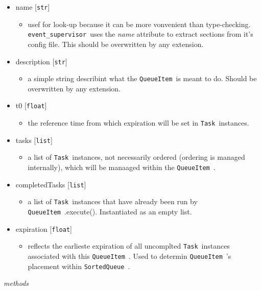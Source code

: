 \documentclass{article}
\newcommand{\SortedQueue}{\texttt{SortedQueue}~}
\newcommand{\QueueItem}{\texttt{QueueItem}~}
\newcommand{\Task}{\texttt{Task}~}
\newcommand{\eventSupervisor}{\texttt{event\_supervisor}~}
\begin{document}
\begin{itemize}
    \item{name [\texttt{str}]
        \begin{itemize}
            \item{usef for look-up because it can be more vonvenient than type-checking. \eventSupervisor uses the \textit{name} attribute to extract sections from it's config file. This should be overwritten by any extension.}
        \end{itemize}
         }
    \item{description [\texttt{str}]
        \begin{itemize}
            \item{a simple string describint what the \QueueItem is meant to do. Should be overwritten by any extension.}
        \end{itemize}
         }
    \item{t0 [\texttt{float}]
        \begin{itemize}
            \item{the reference time from which expiration will be set in \Task instances.}
        \end{itemize}
         }
    \item{tasks [\texttt{list}]
        \begin{itemize}
            \item{a list of \Task instances, not necessarily ordered (ordering is managed internally), which will be manaaged within the \QueueItem.}
        \end{itemize}
         }
    \item{completedTasks [\texttt{list}]
        \begin{itemize}
            \item{a list of \Task instances that have already been run by \QueueItem.execute(). Instantiated as an empty list.}
        \end{itemize}
         }
    \item{expiration [\texttt{float}]
        \begin{itemize}
            \item{reflects the earlieste expiration of all uncomplted \Task instances associated with this \QueueItem. Used to determin \QueueItem's placement within \SortedQueue.}
        \end{itemize}
         }
\end{itemize}

\noindent
\textit{methods}
\end{document}
